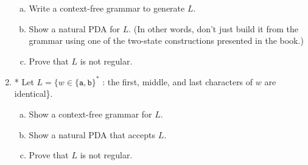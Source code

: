 \documentclass[10pt]{article}
\begin{document}
\begin{enumerate}[1)]
\begin{enumerate}[a)]
\item
Write a context-free grammar to generate $L$.

\item
Show a natural PDA for $L$.  (In other words, don’t just build it from the grammar using one of the two-state constructions presented in the book.)

\item
Prove that $L$ is not regular.
\end{enumerate}



\item
* Let $L = \{w \in \{\texttt{a}, \texttt{b}\}^*$ : the first, middle, and last characters of $w$ are identical\}.
\begin{enumerate}[a)]
\item
Show a context-free grammar for $L$.

\item
Show a natural PDA that accepts $L$.

\item
Prove that $L$ is not regular.
\end{enumerate}
\end{enumerate}
\end{document}

